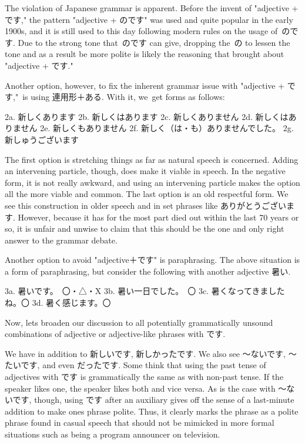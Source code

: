 \par{ The violation of Japanese grammar is apparent. Before the invent of "adjective + です," the pattern "adjective + のです" was used and quite popular in the early 1900s, and it is still used to this day following modern rules on the usage of のです. Due to the strong tone that のです can give, dropping the の to lessen the tone and as a result be more polite is likely the reasoning that brought about "adjective + です." }

\par{ Another option, however, to fix the inherent grammar issue with "adjective + です," is using 連用形＋ある. With it, we get forms as follows: }
 
\par{2a. 新しくあります \hfill\break
2b. 新しくはあります \hfill\break
2c. 新しくありません \hfill\break
2d. 新しくはありません \hfill\break
2e. 新しくもありません \hfill\break
2f. 新しく（は・も）ありませんでした。 \hfill\break
2g. 新しゅうございます  }
 
\par{ The first option is stretching things as far as natural speech is concerned. Adding an intervening particle, though, does make it viable in speech. In the negative form, it is not really awkward, and using an intervening particle makes the option all the more viable and common. The last option is an old respectful form. We see this construction in older speech and in set phrases like ありがとうございます. However, because it has for the most part died out within the last 70 years or so, it is unfair and unwise to claim that this should be the one and only right answer to the grammar debate. }
 
\par{ Another option to avoid "adjective＋です" is paraphrasing. The above situation is a form of paraphrasing, but consider the following with another adjective 暑い. }
 
\par{3a. 暑いです。　〇・△・X 3b. 暑い一日でした。　〇 \hfill\break
3c. 暑くなってきましたね。〇 \hfill\break
3d. 暑く感じます。〇 }
 
\par{  Now, let\textquotesingle s broaden our discussion to all potentially grammatically unsound combinations of adjective or adjective-like phrases with です. }
 
\par{ We have in addition to 新しいです, 新しかったです. We also see ～ないです, ～たいです, and even だったです. Some think that using the past tense of adjectives with です is grammatically the same as with non-past tense. If the speaker likes one, the speaker likes both and vice versa. As is the case with ～ないです, though, using です after an auxiliary gives off the sense of a last-minute addition to make one\textquotesingle s phrase polite. Thus, it clearly marks the phrase as a polite phrase found in casual speech that should not be mimicked in more formal situations such as being a program announcer on television. }
 
